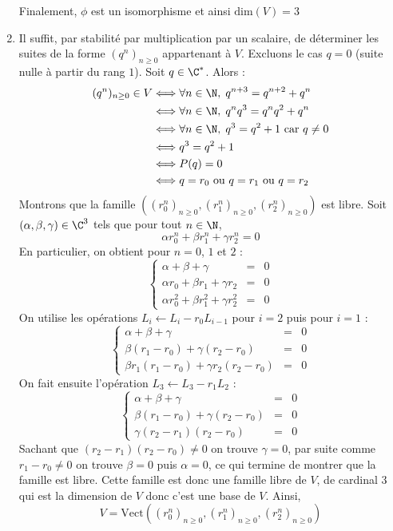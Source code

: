 \documentclass[a4paper,10pt]{report}
\begin{document}
\begin{enumerate}
\noindent Finalement, $\phi$ est un isomorphisme et ainsi $\textrm{dim}(V)=3$
 \item Il suffit, par stabilité par multiplication par un scalaire, de déterminer les suites de la forme $(q^n)_{n \geq 0}$ appartenant à $V$. Excluons le cas $q=0$ (suite nulle à partir du rang $1$). Soit $q\in\C^*$. Alors :
 \begin{align*}
(q^n)_{n \geq 0} \in V & \Longleftrightarrow \forall n\in\N, \; q^{n+3}=q^{n+2}+q^n \\
&\Longleftrightarrow \forall n\in\N, \; q^n q^3=q^{n}q^{2}+q^n \\
&\Longleftrightarrow \forall n\in\N, \; q^3=q^{2}+1 \hbox{ car } q \neq 0 \\
&\Longleftrightarrow  q^3=q^{2}+1  \\
&\Longleftrightarrow P(q)=0 \\
&\Longleftrightarrow q= r_0 \hbox{ ou } q=r_1 \hbox{ ou } q=r_2
\end{align*}
Montrons que la famille $((r_0^n)_{n \geq 0},(r_1^n)_{n \geq 0},(r_2^n)_{n \geq 0})$ est libre. Soit $(\alpha,\beta,\gamma)\in\C^3$ tels que pour tout $n\in\N$, 
$$\alpha r_0^n+\beta r_1^n+\gamma r_2^n=0$$
En particulier, on obtient pour $n=0$, $1$ et $2$ :
$$\left\lbrace\begin{array}{rcl} \alpha+\beta+\gamma&=&0 \\ \alpha r_0+\beta r_1+\gamma r_2&=&0 \\\alpha r_0^2+\beta r_1^2+\gamma r_2^2&=&0\end{array}  \right.$$
On utilise les opérations $L_i\leftarrow L_i-r_0L_{i-1}$ pour $i=2$ puis pour $i=1$ :
$$\left\lbrace\begin{array}{rcl} \alpha+\beta+\gamma&=&0 \\ \beta (r_1-r_0)+\gamma (r_2-r_0)&=&0 \\  \beta r_1(r_1-r_0)+\gamma r_2(r_2-r_0) &=&0\end{array}  \right.$$
On fait ensuite l'opération $L_3\leftarrow L_3-r_1L_2$ : 
$$\left\lbrace\begin{array}{rcl} \alpha+\beta+\gamma&=&0 \\ \beta (r_1-r_0)+\gamma (r_2-r_0)&=&0 \\  \gamma (r_2-r_1)(r_2-r_0) &=&0\end{array}  \right.$$ 
Sachant que $(r_2-r_1)(r_2-r_0)\neq0$ on trouve $\gamma=0$, par suite comme $r_1-r_0\neq 0$ on trouve $\beta=0$ puis $\alpha=0$, ce qui termine de montrer que la famille est libre. Cette famille est donc une famille libre de $V$, de cardinal $3$ qui est la dimension de $V$ donc c'est une base de $V$. Ainsi,
$$V=\textrm{Vect}((r_0^n)_{n \geq 0},(r_1^n)_{n \geq 0},(r_2^n)_{n \geq 0})$$


\end{enumerate}
\end{document}
